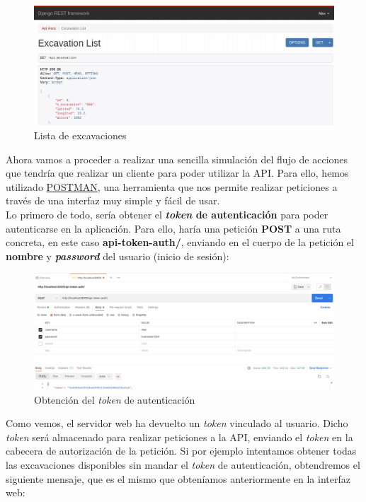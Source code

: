         \begin{figure}[H]
            \centering
            \includegraphics[scale=0.30]{imagenes/list-excavations.png}
            \caption{Lista de excavaciones}
            \label{fig:list-excavations}
        \end{figure}

Ahora vamos a proceder a realizar una sencilla simulación del flujo de acciones que tendría
que realizar un cliente para poder utilizar la API. Para ello, hemos utilizado
\href{https://www.postman.com/}{POSTMAN}, una herramienta que nos permite realizar
peticiones a través de una interfaz muy simple y fácil de usar.\\

Lo primero de todo, sería obtener el \textbf{\textit{token} de autenticación} para poder
autenticarse en la aplicación. Para ello, haría una petición \textbf{POST} a una ruta
concreta, en este caso \textbf{api-token-auth/}, enviando en el cuerpo de la petición el
\textbf{nombre} y \textbf{\textit{password}} del usuario (inicio de sesión):

        \begin{figure}[H]
            \centering
            \includegraphics[scale=0.25]{imagenes/get-token.png}
            \caption{Obtención del \textit{token} de autenticación}
            \label{fig:get-token}
        \end{figure}

Como vemos, el servidor web ha devuelto un \textit{token} vinculado al usuario. Dicho
\textit{token} será almacenado para realizar peticiones a la API, enviando el \textit{token}
en la cabecera de autorización de la petición. Si por ejemplo intentamos obtener todas las
excavaciones disponibles sin mandar el \textit{token} de autenticación, obtendremos el
siguiente mensaje, que es el mismo que obteníamos anteriormente en la interfaz web:

